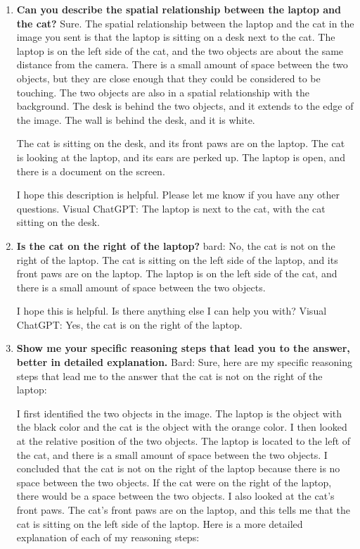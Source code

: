     \begin{enumerate}
        \item \textbf{Can you describe the spatial relationship between the laptop and the cat?}
        \subitem 
        Sure. The spatial relationship between the laptop and the cat in the image you sent is that the laptop is sitting on a desk next to the cat. The laptop is on the left side of the cat, and the two objects are about the same distance from the camera. There is a small amount of space between the two objects, but they are close enough that they could be considered to be touching.
        The two objects are also in a spatial relationship with the background. The desk is behind the two objects, and it extends to the edge of the image. The wall is behind the desk, and it is white.

        The cat is sitting on the desk, and its front paws are on the laptop. The cat is looking at the laptop, and its ears are perked up. The laptop is open, and there is a document on the screen.

        I hope this description is helpful. Please let me know if you have any other questions.
        \subitem Visual ChatGPT: The laptop is next to the cat, with the cat sitting on the desk.
        \item \textbf{Is the cat on the right of the laptop?}
        \subitem bard: No, the cat is not on the right of the laptop. The cat is sitting on the left side of the laptop, and its front paws are on the laptop. The laptop is on the left side of the cat, and there is a small amount of space between the two objects.

        I hope this is helpful. Is there anything else I can help you with?
        \subitem Visual ChatGPT: Yes, the cat is on the right of the laptop.
        \item \textbf{Show me your specific reasoning steps that lead you to the answer, better in detailed explanation.}
        \subitem Bard:
        Sure, here are my specific reasoning steps that lead me to the answer that the cat is not on the right of the laptop:
        
        I first identified the two objects in the image. The laptop is the object with the black color and the cat is the object with the orange color.
        I then looked at the relative position of the two objects. The laptop is located to the left of the cat, and there is a small amount of space between the two objects.
        I concluded that the cat is not on the right of the laptop because there is no space between the two objects. If the cat were on the right of the laptop, there would be a space between the two objects.
        I also looked at the cat's front paws. The cat's front paws are on the laptop, and this tells me that the cat is sitting on the left side of the laptop.
        Here is a more detailed explanation of each of my reasoning steps:
        

\end{enumerate}
